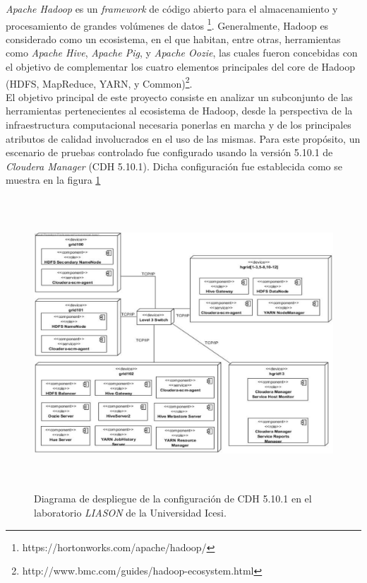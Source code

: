 \textit{Apache Hadoop} es un \textit{framework} de código abierto para el almacenamiento y procesamiento de grandes volúmenes de datos \footnote{https://hortonworks.com/apache/hadoop/}. Generalmente, Hadoop es considerado como un ecosistema, en el que habitan, entre otras, herramientas como \textit{Apache Hive}, \textit{Apache Pig}, y \textit{Apache Oozie}, las cuales fueron concebidas con el objetivo de complementar los cuatro elementos principales del core de Hadoop (HDFS, MapReduce, YARN, y Common)\footnote{http://www.bmc.com/guides/hadoop-ecosystem.html}. \\

El objetivo principal de este proyecto consiste en analizar un subconjunto de las herramientas pertenecientes al ecosistema de Hadoop, desde la perspectiva de la infraestructura computacional necesaria ponerlas en marcha y de los principales atributos de calidad involucrados en el uso de las mismas. Para este propósito, un escenario de pruebas controlado fue configurado usando la versión 5.10.1 de \textit{Cloudera Manager} (CDH 5.10.1). Dicha configuración fue establecida como se muestra en la figura \ref{deployment_diagram}

\begin{figure}[H]
  \centering
      \includegraphics[width=6.0in, height=4.3in]{fig/deployment}
  \caption{Diagrama de despliegue de la configuración de CDH 5.10.1 en el laboratorio \textit{LIASON} de la Universidad Icesi.}
  \label{deployment_diagram}
\end{figure}

